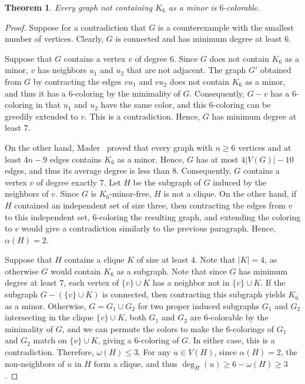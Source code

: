 \documentclass[12pt,twoside,openright,a4paper]{book}
\newtheorem{theorem}{Theorem}[chapter]
\begin{document}
\begin{theorem}
Every graph not containing $K_6$ as a minor is $6$-colorable.
\end{theorem}
\begin{proof}
Suppose for a contradiction that $G$ is a counterexample with the smallest number of vertices.
Clearly, $G$ is connected and has minimum degree at least $6$.

Suppose that $G$ contains a vertex $v$ of degree $6$.  Since $G$ does not contain $K_6$ as a minor,
$v$ has neighbors $u_1$ and $u_2$ that are not adjacent.  The graph $G'$ obtained from $G$ by contracting
the edges $vu_1$ and $vu_2$ does not contain $K_6$ as a minor, and thus it has a $6$-coloring by the minimality of $G$.
Consequently, $G-v$ has a $6$-coloring in that $u_1$ and $u_2$ have the same color, and this $6$-coloring can be greedily extended to $v$.
This is a contradiction.  Hence, $G$ has minimum degree at least $7$.

On the other hand, Mader~\cite{mader1968homomorphiesatze} proved that every graph with $n\ge 6$
vertices and at least $4n-9$ edges contains $K_6$ as a minor.  Hence, $G$ has at most $4|V(G)|-10$
edges, and thus its average degree is less than $8$.  Consequently, $G$ contains a vertex $v$ of degree exactly $7$.
Let $H$ be the subgraph of $G$ induced by the neighbors of $v$.  Since $G$ is $K_6$-minor-free, $H$ is not a clique.
On the other hand, if $H$ contained an independent set of size three, then contracting the edges from $v$ to this independent
set, $6$-coloring the resulting graph, and extending the coloring to $v$ would give a contradiction similarly to the previous paragraph.
Hence, $\alpha(H)=2$.

Suppose that $H$ contains a clique $K$ of size at least $4$.  Note that $|K|=4$, as otherwise $G$ would contain $K_6$ as a subgraph.
Note that since $G$ has minimum degree at least $7$, each vertex of $\{v\}\cup K$ has a neighbor not in $\{v\}\cup K$.
If the subgraph $G-(\{v\}\cup K)$ is connected, then contracting this subgraph yields $K_6$ as a minor.
Otherwise, $G=G_1\cup G_2$ for two proper induced subgraphs $G_1$ and $G_2$ intersecting in the clique $\{v\}\cup K$,
both $G_1$ and $G_2$ are $6$-colorable by the minimality of $G$, and we can permute the colors to make the $6$-colorings
of $G_1$ and $G_2$ match on $\{v\}\cup K$, giving a $6$-coloring of $G$.  In either case, this is a contradiction.
Therefore, $\omega(H)\le 3$.  For any $u\in V(H)$, since $\alpha(H)=2$, the non-neighbors of $u$ in $H$ form a clique,
and thus $\deg_H(u)\ge 6-\omega(H)\ge 3$.


\end{proof}
\end{document}
